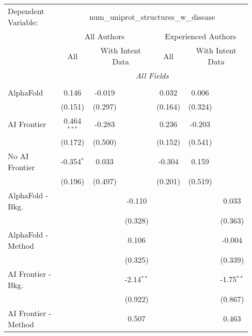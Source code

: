 \begingroup
\centering
\begin{tabular}{lcccccc}
   \tabularnewline \midrule \midrule
   Dependent Variable: & \multicolumn{6}{c}{num\_uniprot\_structures\_w\_disease}\\
 & \multicolumn{3}{c}{All Authors} & \multicolumn{3}{c}{Experienced Authors} \\
\cmidrule(lr){2-4} \cmidrule(lr){5-7}
 & \multicolumn{1}{c}{All} & \multicolumn{2}{c}{With Intent Data} & \multicolumn{1}{c}{All} & \multicolumn{2}{c}{With Intent Data} \\
\cmidrule(lr){2-2} \cmidrule(lr){3-4} \cmidrule(lr){5-5} \cmidrule(lr){6-7}
 & \multicolumn{6}{c}{\textit{All Fields}} \\ \\
   AlphaFold               & 0.146         & -0.019  &              & 0.032   & 0.006   &   \\   
                           & (0.151)       & (0.297) &              & (0.164) & (0.324) &   \\   
   AI Frontier             & 0.464$^{***}$ & -0.283  &              & 0.236   & -0.203  &   \\   
                           & (0.172)       & (0.500) &              & (0.152) & (0.541) &   \\   
   No AI Frontier          & -0.354$^{*}$  & 0.033   &              & -0.304  & 0.159   &   \\   
                           & (0.196)       & (0.497) &              & (0.201) & (0.519) &   \\   
   AlphaFold - Bkg.        &               &         & -0.110       &         &         & 0.033\\   
                           &               &         & (0.328)      &         &         & (0.363)\\   
   AlphaFold - Method      &               &         & 0.106        &         &         & -0.004\\   
                           &               &         & (0.325)      &         &         & (0.339)\\   
   AI Frontier - Bkg.      &               &         & -2.14$^{**}$ &         &         & -1.75$^{**}$\\   
                           &               &         & (0.922)      &         &         & (0.867)\\   
   AI Frontier - Method    &               &         & 0.507        &         &         & 0.463\\   

\end{tabular}
